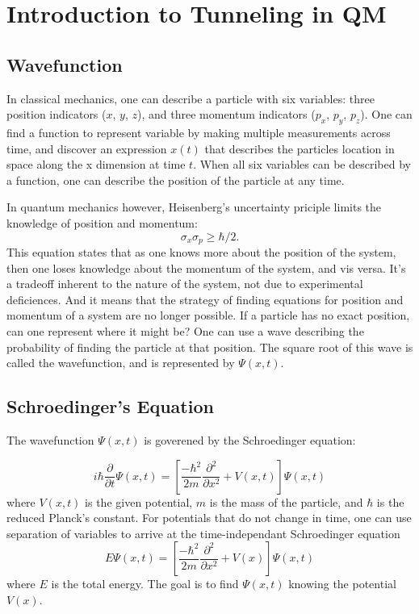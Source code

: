 \chapter{Introduction to Tunneling in QM}	


\section{Wavefunction}	
In classical mechanics, one can describe a particle with six variables: three position indicators ($x$, $y$, $z$), and three momentum indicators ($p_x$, $p_y$, $p_z$). One can find a function to represent variable by making multiple measurements across time, and discover an expression $x(t)$ that describes the particles location in space along the x dimension at time $t$. When all six variables can be described by a function, one can describe the position of the particle at any time.  

In quantum mechanics however, Heisenberg's uncertainty priciple limits the knowledge of position and momentum: 
$$\sigma_{x} \sigma_{p} \geq \hbar/2. $$
This equation states that as one knows more about the position of the system, then one loses knowledge about the momentum of the system, and vis versa. It's a tradeoff inherent to the nature of the system, not due to experimental deficiences. And it means that the strategy of finding equations for position and momentum of a system are no longer possible. If a particle has no exact position, can one represent where it might be? One can use a wave describing the probability of finding the particle at that position. The square root of this wave is called the wavefunction, and is represented by $\Psi(x, t)$.


\section{Schroedinger's Equation}

The wavefunction $\Psi(x, t)$ is goverened by the Schroedinger equation:

$$i\hbar\frac{\partial}{\partial t} \Psi(x,t) = \left [ \frac{-\hbar^2}{2m}\frac{\partial^2}{\partial x^2} + V(x,t)\right ] \Psi(x,t) $$
where $V(x,t)$ is the given potential, $m$ is the mass of the particle, and $\hbar$ is the reduced Planck's constant. For potentials that do not change in time, one can use separation of variables to arrive at the time-independant Schroedinger equation
$$E \Psi(x,t) = \left [ \frac{-\hbar^2}{2m}\frac{\partial^2}{\partial x^2} + V(x)\right ] \Psi(x,t)$$
where $E$ is the total energy. The goal is to find $\Psi(x,t)$ knowing the potential $V(x)$.




